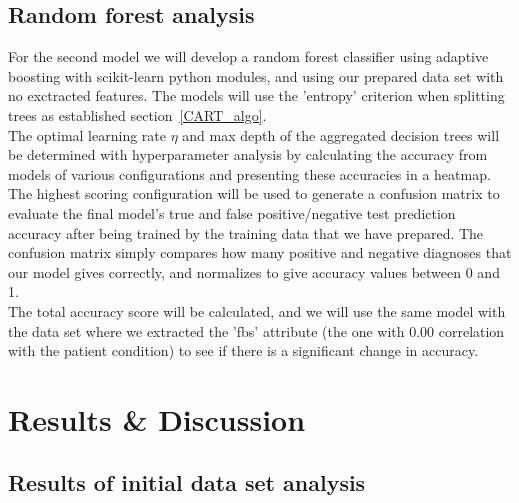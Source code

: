 \documentclass[reprint,english,notitlepage]{revtex4-1}  %
\begin{document}
\subsection{Random forest analysis}
For the second model we will develop a random forest classifier using adaptive boosting with scikit-learn python modules, and using our prepared data set with no exctracted features. The models will use the 'entropy' criterion when splitting trees as established section~\ref{CART_algo}.
\vspace{3mm}
\\
The optimal learning rate $\eta$ and max depth of the aggregated decision trees will be determined with hyperparameter analysis by calculating the accuracy from models of various configurations and presenting these accuracies in a heatmap.
\vspace{3mm}
\\
The highest scoring configuration will be used to generate a confusion matrix to evaluate the final model's true and false positive/negative test prediction accuracy after being trained by the training data that we have prepared. The confusion matrix simply compares how many positive and negative diagnoses that our model gives correctly, and normalizes to give accuracy values between 0 and 1. 
\vspace{3mm}
\\
The total accuracy score will be calculated, and we will use the same model with the data set where we extracted the 'fbs' attribute (the one with 0.00 correlation with the patient condition) to see if there is a significant change in accuracy.

\section{Results \& Discussion}\label{sec: results}

\subsection{Results of initial data set analysis}
\end{document}
